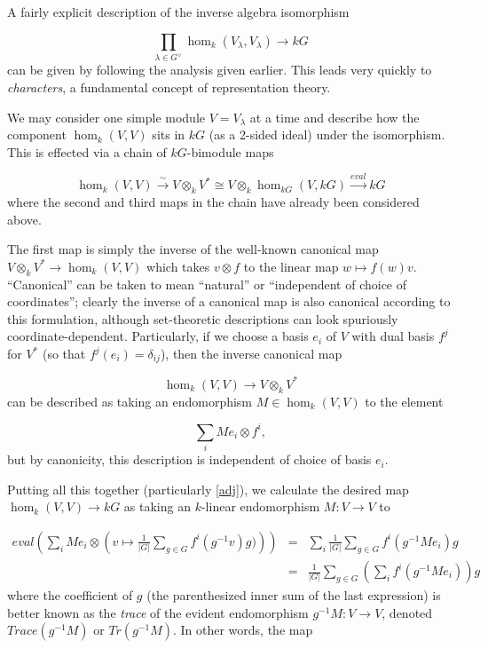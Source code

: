 \documentclass[12pt,titlepage]{article}
\newcommand{\itexarray}[1]{\begin{matrix}#1\end{matrix}}
\theoremstyle{plain}
\theoremstyle{definition}
\theoremstyle{remark}
\begin{document}
A fairly explicit description of the inverse algebra isomorphism

\begin{displaymath}
\prod_{\lambda \in G^\vee} \hom_k(V_\lambda, V_\lambda) \to k G
\end{displaymath}
can be given by following the analysis given earlier. This leads very quickly to \emph{characters}, a fundamental concept of representation theory.

We may consider one simple module $V = V_\lambda$ at a time and describe how the component $\hom_k(V, V)$ sits in $k G$ (as a 2-sided ideal) under the isomorphism. This is effected via a chain of $k G$-bimodule maps

\begin{displaymath}
\hom_k(V, V) \stackrel{\sim}{\to} V \otimes_k V^\ast \cong V \otimes_k \hom_{k G}(V, k G) \stackrel{eval}{\to} k G
\end{displaymath}
where the second and third maps in the chain have already been considered above.

The first map is simply the inverse of the well-known canonical map $V \otimes_k V^\ast \to \hom_k(V, V)$ which takes $v \otimes f$ to the linear map $w \mapsto f(w) v$. ``Canonical'' can be taken to mean ``natural'' or ``independent of choice of coordinates''; clearly the inverse of a canonical map is also canonical according to this formulation, although set-theoretic descriptions can look spuriously coordinate-dependent. Particularly, if we choose a basis $e_i$ of $V$ with dual basis $f^j$ for $V^\ast$ (so that $f^j(e_i) = \delta_{i j}$), then the inverse canonical map

\begin{displaymath}
\hom_k(V, V) \to V \otimes_k V^\ast
\end{displaymath}
can be described as taking an endomorphism $M \in \hom_k(V, V)$ to the element

\begin{displaymath}
\sum_i M e_i \otimes f^i,
\end{displaymath}
but by canonicity, this description is independent of choice of basis $e_i$.

Putting all this together (particularly \eqref{adj}), we calculate the desired map $\hom_k(V, V) \to k G$ as taking an $k$-linear endomorphism $M: V \to V$ to

\begin{displaymath}
\itexarray{
eval\left(\sum_i M e_i \otimes \left(v \mapsto \frac1{{|G|}} \sum_{g \in G} f^i(g^{-1} v) g) \right)\right) & = & \sum_i \frac1{{|G|}} \sum_{g \in G} f^i(g^{-1} M e_i) g \\ 
 & = & \frac1{{|G|}} \sum_{g \in G} \left( \sum_i f^i(g^{-1} M e_i) \right) g
}
\end{displaymath}
where the coefficient of $g$ (the parenthesized inner sum of the last expression) is better known as the \emph{trace} of the evident endomorphism $g^{-1}M: V \to V$, denoted $Trace(g^{-1}M)$ or $Tr(g^{-1}M)$. In other words, the map
\end{document}
